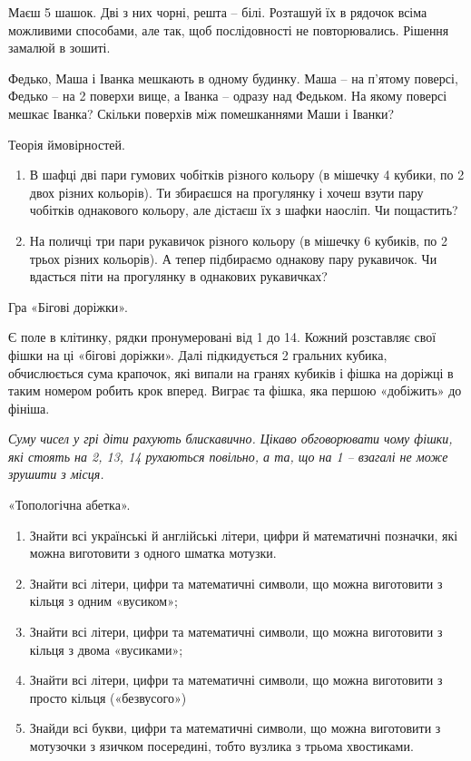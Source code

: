 \problem
Маєш 5 шашок. Дві з них чорні, решта – білі.
Розташуй їх в рядочок всіма можливими способами, але так,
щоб послідовності не повторювались.
Рішення замалюй в зошиті.


\problem
Федько, Маша і Іванка мешкають в одному будинку.
Маша – на п’ятому поверсі, Федько – на 2 поверхи вище,
а Іванка – одразу над Федьком.
На якому поверсі мешкає Іванка?
Скільки поверхів між помешканнями Маши і Іванки?


\problem
Теорія ймовірностей.
\begin{enumerate}
    \item В шафці дві пари гумових чобітків різного кольору
    (в мішечку 4 кубики, по 2 двох різних кольорів).
    Ти збираєшся на прогулянку і хочеш взути пару чобітків однакового кольору,
    але дістаєш їх з шафки наосліп. Чи пощастить?
    \item На поличці три пари рукавичок різного кольору
    (в мішечку 6 кубиків, по 2 трьох різних кольорів).
    А тепер підбираємо однакову пару рукавичок.
    Чи вдасться піти на прогулянку в однакових рукавичках?
\end{enumerate}


\problem
Гра «Бігові доріжки».

Є поле в клітинку, рядки пронумеровані від 1 до 14.
Кожний розставляє свої фішки на ці «бігові доріжки».
Далі підкидується 2 гральних кубика, обчислюється сума крапочок,
які випали на гранях кубиків і фішка на доріжці в таким номером
робить крок вперед.
Виграє та фішка, яка першою «добіжить» до фініша.

\emph{
Суму чисел у грі діти рахують блискавично.
Цікаво обговорювати чому фішки, які стоять на 2, 13, 14 рухаються повільно,
а та, що на 1 – взагалі не може зрушити з місця.
}


\problem
«Топологічна абетка».
\begin{enumerate}
    \item Знайти всі українські й англійські літери, цифри
    й математичні позначки, які можна виготовити з одного шматка мотузки.
    \item Знайти всі літери, цифри та математичні символи,
    що можна виготовити з кільця з одним «вусиком»;
    \item Знайти всі літери, цифри та математичні символи,
    що можна виготовити з кільця з двома «вусиками»;
    \item Знайти всі літери, цифри та математичні символи,
    що можна виготовити з просто кільця («безвусого»)
    \item Знайди всі букви, цифри та математичні символи,
    що можна виготовити з мотузочки з язичком посередині,
    тобто вузлика з трьома хвостиками.
\end{enumerate}

